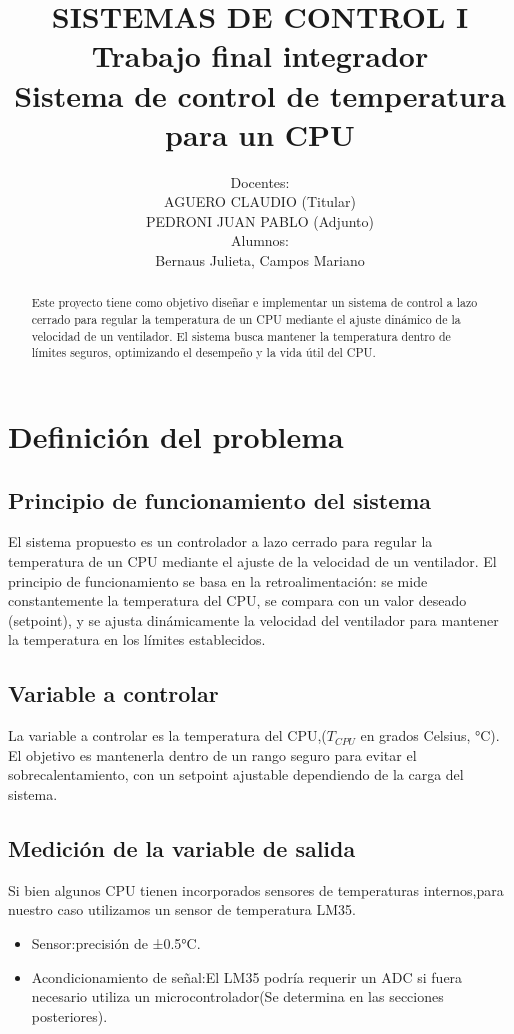 \documentclass[12pt]{article}
\title{SISTEMAS DE CONTROL I \\ Trabajo final integrador 
	\\ Sistema de control de temperatura para un CPU}
\author{Docentes:\\ AGUERO CLAUDIO (Titular) \\ PEDRONI JUAN PABLO (Adjunto)
	\\ Alumnos: \\ Bernaus Julieta, Campos Mariano}
\begin{document}
	
\maketitle

\begin{abstract}
	Este proyecto tiene como objetivo diseñar e implementar un sistema de control a lazo cerrado para regular la temperatura de un CPU mediante el ajuste dinámico de la velocidad de un ventilador. El sistema busca mantener la temperatura dentro de límites seguros, optimizando el desempeño y la vida útil del CPU.
\end{abstract}\newpage

\tableofcontents \newpage

\section{Definición del problema}

	\subsection{Principio de funcionamiento del sistema}
	El sistema propuesto es un controlador a lazo cerrado para regular la temperatura de un CPU mediante el ajuste de la velocidad de un ventilador. El principio de funcionamiento se basa en la retroalimentación: se mide constantemente la temperatura del CPU, se compara con un valor deseado (setpoint), y se ajusta dinámicamente la velocidad del ventilador para mantener la temperatura en los límites establecidos.

	\subsection{Variable a controlar}
	La variable a controlar es la temperatura del CPU,($T_{CPU}$ en grados Celsius, °C). El objetivo es mantenerla dentro de un rango seguro para evitar el sobrecalentamiento, con un setpoint ajustable dependiendo de la carga del sistema.
	
	\subsection{Medición de la variable de salida}
	Si bien algunos CPU tienen incorporados sensores de temperaturas internos,para nuestro caso utilizamos un sensor de temperatura LM35.
	
	\begin{itemize}
		\item Sensor:precisión de ±0.5°C.
		\item Acondicionamiento de señal:El LM35 podría requerir un ADC si fuera necesario utiliza un microcontrolador(Se determina en las secciones posteriores).
	\end{itemize}
	
\end{document}
